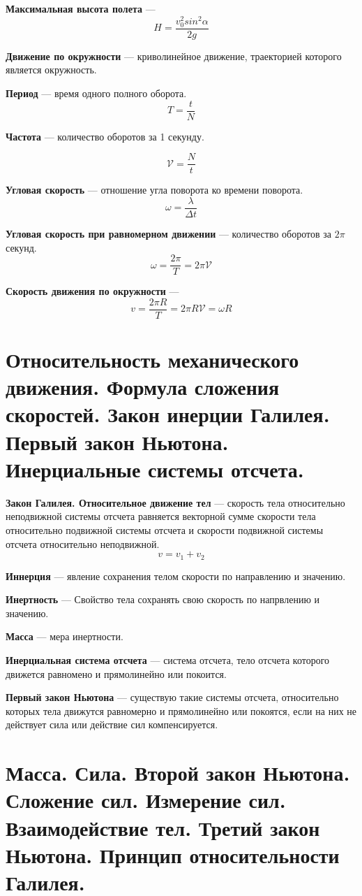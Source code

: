 \documentclass{report}
\begin{document}
{\bf Максимальная высота полета} ---
$$
H=\frac{v^2_0sin^2{\alpha}}{2g}
$$

{\bf Движение по окружности} ---
криволинейное движение, траекторией которого является окружность.

{\bf Период} ---
время одного полного оборота.
$$
T=\frac{t}{N}
$$

{\bf Частота} ---
количество оборотов за 1 секунду.

$$
\mathcal{V} = \frac{N}{t}
$$

{\bf Угловая скорость} ---
отношение угла поворота ко времени поворота.
$$
\omega =\frac{\lambda}{\Delta t}
$$

{\bf Угловая скорость при равномерном движении} ---
количество оборотов за $2\pi$ секунд.
$$
\omega =\frac{2\pi}{T}=2\pi \mathcal{V}
$$

{\bf Скорость движения по окружности} ---
$$
v=\frac{2\pi R}{T}=2\pi R \mathcal{V} = \omega R
$$



\part{Относительность механического движения. 
Формула сложения скоростей. 
Закон инерции Галилея. 
Первый закон Ньютона. 
Инерциальные системы отсчета. }

{\bf Закон Галилея. Относительное движение тел} ---
скорость тела относительно неподвижной системы отсчета равняется векторной 
сумме скорости тела относительно подвижной системы отсчета и скорости 
подвижной системы отсчета относительно неподвижной.
$$
v=v_1+v_2
$$

{\bf Иннерция} ---
явление сохранения телом скорости по направлению и значению.

{\bf Инертность} ---
Свойство тела сохранять свою скорость по напрвлению и значению.

{\bf Масса} ---
мера инертности.

{\bf Инерциальная система отсчета} ---
система отсчета, тело отсчета которого движется равномено и прямолинейно или покоится.

{\bf Первый закон Ньютона} ---
существую такие системы отсчета, относительно которых тела движутся равномерно и прямолинейно или 
покоятся, если на них не действует сила или действие сил компенсируется.



\part{ Масса. 
Сила. 
Второй закон Ньютона. 
Сложение сил. 
Измерение сил. 
Взаимодействие тел. 
Третий закон Ньютона. 
Принцип относительности Галилея.}
\end{document}
